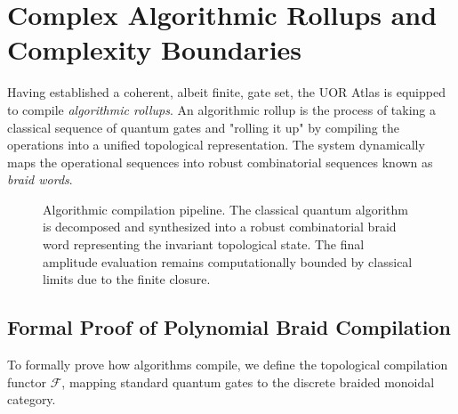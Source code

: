 \section{Complex Algorithmic Rollups and Complexity Boundaries}

Having established a coherent, albeit finite, gate set, the UOR Atlas is equipped to compile \textit{algorithmic rollups}. An algorithmic rollup is the process of taking a classical sequence of quantum gates and "rolling it up" by compiling the operations into a unified topological representation. The system dynamically maps the operational sequences into robust combinatorial sequences known as \textit{braid words}. 

\begin{figure}[h]
\centering
{}
\caption{Algorithmic compilation pipeline. The classical quantum algorithm is decomposed and synthesized into a robust combinatorial braid word representing the invariant topological state. The final amplitude evaluation remains computationally bounded by classical limits due to the finite closure.}
\label{fig:compilation}
\end{figure}

\subsection{Formal Proof of Polynomial Braid Compilation}
To formally prove how algorithms compile, we define the topological compilation functor $\mathcal{F}$, mapping standard quantum gates to the discrete braided monoidal category.

